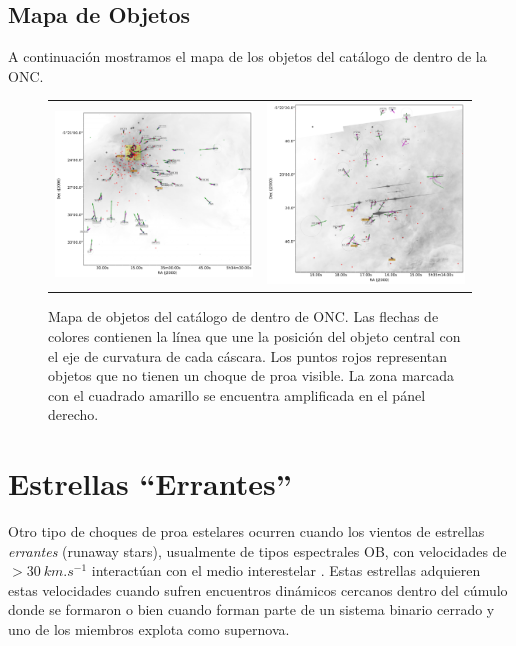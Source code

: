 \subsection{Mapa de Objetos}

A continuación mostramos el mapa de los objetos del catálogo de \citet{Gutierrez-Soto:2015a} dentro de la ONC.

\begin{figure}
  \centering
  \begin{tabular}{cc}
    \includegraphics[width=0.5\linewidth]{./Figures/ll-pos-image-Luis} & \includegraphics[width=0.46\linewidth]{./Figures/ll-pos-image-zoom-Luis}
  \end{tabular}
  \caption{Mapa de objetos del catálogo de \citet{Gutierrez-Soto:2015a} dentro de ONC. Las flechas de colores contienen la línea que une la posición del objeto central con el eje de curvatura de cada cáscara. Los puntos rojos representan objetos que no tienen un choque de proa visible. La zona marcada con el cuadrado amarillo se encuentra amplificada en el pánel derecho.}
  \label{fig:orion-map-LL}
\end{figure}


\section{Estrellas ``Errantes''}

Otro tipo de choques de proa estelares ocurren cuando los vientos de estrellas \textit{errantes} (runaway stars), usualmente de tipos espectrales OB, con velocidades de $ >\SI{30}{km.s^{-1}}$ interactúan con el medio interestelar \citep{Kobulnicky:2016}. Estas estrellas adquieren estas velocidades cuando sufren encuentros dinámicos cercanos dentro del cúmulo donde se formaron o bien cuando forman parte de un sistema binario cerrado y uno de los miembros explota como supernova.

